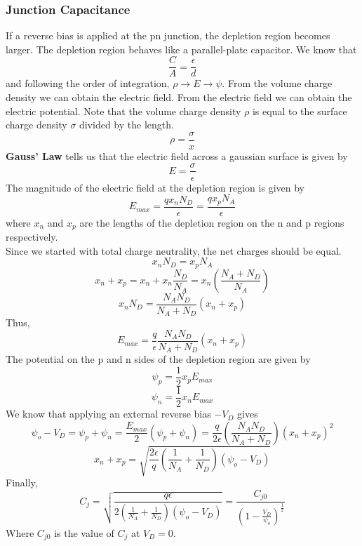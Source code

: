 \documentclass{article}
\begin{document}
\newpage
\subsubsection{Junction Capacitance}
\noindent 
If a reverse bias is applied at the pn junction, the depletion region becomes larger. 
The depletion region behaves like a parallel-plate capacitor. We know that 
$$\frac{C}{A} = \frac{\epsilon}{d}$$
and following the order of integration, $\rho \rightarrow E \rightarrow \psi.$ 
From the volume charge density we can obtain the electric field. From the electric field 
we can obtain the electric potential. Note that the volume charge density $\rho$ is 
equal to the surface charge density $\sigma$ divided by the length. 
$$\rho = \frac{\sigma}{x}$$
\vspace{8pt}
\textbf{Gauss' Law} tells us that the electric field across a gaussian surface is given 
by $$E=\frac{\sigma}{\epsilon}$$
The magnitude of the electric field at the depletion region is given by
$$\boxed{E_{max} = \frac{qx_nN_D}{\epsilon} = \frac{qx_pN_A}{\epsilon}}$$ where $x_n$ and $x_p$
are the lengths of the depletion region on the n and p regions respectively. 
\vspace{8pt}
\\ Since we started with total charge neutrality, the net charges should be equal. 
$$x_nN_D = x_pN_A$$
$$x_n + x_p = x_n + x_n \frac{N_D}{N_A} = x_n \left(\frac{N_A + N_D}{N_A}\right)$$
$$\boxed{x_n N_D = \frac{N_A N_D}{N_A + N_D}(x_n + x_p)}$$
Thus, $$E_{max}= \frac{q}{\epsilon} \frac{N_A N_D}{N_A + N_D}(x_n + x_p)$$
The potential on the p and n sides of the depletion region are given by 
$$\psi_p = \frac{1}{2}x_p E_{max}$$ $$\psi_n = \frac{1}{2}x_n E_{max}$$
We know that applying an external reverse bias $-V_D$ gives 
$$\psi_o - V_D = \psi_p + \psi_n = \frac{E_{max}}{2}(\psi_p + \psi_n)
= \frac{q}{2\epsilon}\left(\frac{N_A N_D}{N_A + N_D}\right)(x_n + x_p)^2$$
$$x_n + x_p = \sqrt{\frac{2\epsilon}{q}\left(\frac{1}{N_A}+\frac{1}{N_D}\right) 
(\psi_o - V_D)}$$
Finally, 
$$\boxed{C_j = \sqrt{\frac{q\epsilon}{2\left(\frac{1}{N_A}+\frac{1}{N_D}\right)
(\psi_o -V_D)}} = \frac{C_{j0}}{\left(1-\frac{V_D}{\psi_o}\right)^\frac{1}{2}}}$$
Where $C_{j0}$ is the value of $C_j$ at $V_D = 0$.
 


\vspace{8pt}
\end{document}

